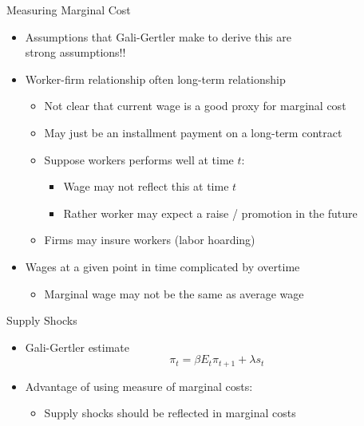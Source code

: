 \documentclass[11pt,aspectratio=169,xcolor={dvipsnames},hyperref={pdftex,pdfpagemode=UseNone,hidelinks,pdfdisplaydoctitle=true},usepdftitle=false]{beamer}
\begin{document}
\begin{frame}{Measuring Marginal Cost}
\begin{itemize}
\itemsep1em 
\item  Assumptions that Gali-Gertler make to derive this are \\ strong assumptions!!
\item Worker-firm relationship often long-term relationship
\begin{itemize}
\item Not clear that current wage is a good proxy for marginal cost
\item May just be an installment payment on a long-term contract
\item Suppose workers performs well at time $t$:
\begin{itemize}
\item  Wage may not reflect this at time $t$
\item Rather worker may expect a raise / promotion in the future
\end{itemize}
\item Firms may insure workers (labor hoarding)
\end{itemize}
\item Wages at a given point in time complicated by overtime 
\begin{itemize}
\item Marginal wage may not be the same as average wage
\end{itemize}
\end{itemize}
\end{frame}

\begin{frame}{Supply Shocks}
\begin{itemize}
\itemsep1em 
\item Gali-Gertler estimate
\[ \pi_{t} = \beta E_{t} \pi_{t+1} + \lambda s_{t} \]
\item Advantage of using measure of marginal costs:
\begin{itemize}
\item Supply shocks should be reflected in marginal costs
\end{itemize}
\end{itemize}
\end{frame}
\end{document}
